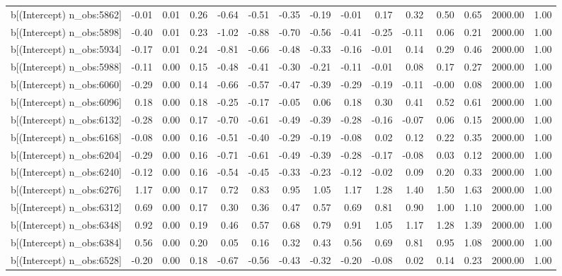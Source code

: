 \begin{table}[ht]
\begin{tabular}{rrrrrrrrrrrrrrr}
  b[(Intercept) n\_obs:5862] & -0.01 & 0.01 & 0.26 & -0.64 & -0.51 & -0.35 & -0.19 & -0.01 & 0.17 & 0.32 & 0.50 & 0.65 & 2000.00 & 1.00 \\ 
  b[(Intercept) n\_obs:5898] & -0.40 & 0.01 & 0.23 & -1.02 & -0.88 & -0.70 & -0.56 & -0.41 & -0.25 & -0.11 & 0.06 & 0.21 & 2000.00 & 1.00 \\ 
  b[(Intercept) n\_obs:5934] & -0.17 & 0.01 & 0.24 & -0.81 & -0.66 & -0.48 & -0.33 & -0.16 & -0.01 & 0.14 & 0.29 & 0.46 & 2000.00 & 1.00 \\ 
  b[(Intercept) n\_obs:5988] & -0.11 & 0.00 & 0.15 & -0.48 & -0.41 & -0.30 & -0.21 & -0.11 & -0.01 & 0.08 & 0.17 & 0.27 & 2000.00 & 1.00 \\ 
  b[(Intercept) n\_obs:6060] & -0.29 & 0.00 & 0.14 & -0.66 & -0.57 & -0.47 & -0.39 & -0.29 & -0.19 & -0.11 & -0.00 & 0.08 & 2000.00 & 1.00 \\ 
  b[(Intercept) n\_obs:6096] & 0.18 & 0.00 & 0.18 & -0.25 & -0.17 & -0.05 & 0.06 & 0.18 & 0.30 & 0.41 & 0.52 & 0.61 & 2000.00 & 1.00 \\ 
  b[(Intercept) n\_obs:6132] & -0.28 & 0.00 & 0.17 & -0.70 & -0.61 & -0.49 & -0.39 & -0.28 & -0.16 & -0.07 & 0.06 & 0.15 & 2000.00 & 1.00 \\ 
  b[(Intercept) n\_obs:6168] & -0.08 & 0.00 & 0.16 & -0.51 & -0.40 & -0.29 & -0.19 & -0.08 & 0.02 & 0.12 & 0.22 & 0.35 & 2000.00 & 1.00 \\ 
  b[(Intercept) n\_obs:6204] & -0.29 & 0.00 & 0.16 & -0.71 & -0.61 & -0.49 & -0.39 & -0.28 & -0.17 & -0.08 & 0.03 & 0.12 & 2000.00 & 1.00 \\ 
  b[(Intercept) n\_obs:6240] & -0.12 & 0.00 & 0.16 & -0.54 & -0.45 & -0.33 & -0.23 & -0.12 & -0.02 & 0.09 & 0.20 & 0.33 & 2000.00 & 1.00 \\ 
  b[(Intercept) n\_obs:6276] & 1.17 & 0.00 & 0.17 & 0.72 & 0.83 & 0.95 & 1.05 & 1.17 & 1.28 & 1.40 & 1.50 & 1.63 & 2000.00 & 1.00 \\ 
  b[(Intercept) n\_obs:6312] & 0.69 & 0.00 & 0.17 & 0.30 & 0.36 & 0.47 & 0.57 & 0.69 & 0.81 & 0.90 & 1.00 & 1.10 & 2000.00 & 1.00 \\ 
  b[(Intercept) n\_obs:6348] & 0.92 & 0.00 & 0.19 & 0.46 & 0.57 & 0.68 & 0.79 & 0.91 & 1.05 & 1.17 & 1.28 & 1.39 & 2000.00 & 1.00 \\ 
  b[(Intercept) n\_obs:6384] & 0.56 & 0.00 & 0.20 & 0.05 & 0.16 & 0.32 & 0.43 & 0.56 & 0.69 & 0.81 & 0.95 & 1.08 & 2000.00 & 1.00 \\ 
  b[(Intercept) n\_obs:6528] & -0.20 & 0.00 & 0.18 & -0.67 & -0.56 & -0.43 & -0.32 & -0.20 & -0.08 & 0.02 & 0.14 & 0.23 & 2000.00 & 1.00 \\ 

\end{tabular}
\end{table}
